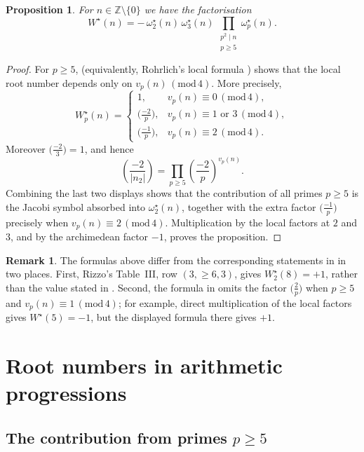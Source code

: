 \documentclass[12pt,reqno]{amsart}
\numberwithin{equation}{section}
\newtheorem{proposition}[theorem]{Proposition}
\theoremstyle{definition}
\newtheorem{remark}[theorem]{Remark}
\renewcommand{\ge}{\geqslant}
\newcommand{\ZZ}{\mathbb{Z}}
\newcommand{\rw}{W}
\renewcommand{\pmod}[1]{\,(\mathrm{mod}\,#1)}
\begin{document}
\begin{proposition}\label{prop:rootnumber-factor-1728}
For $n\in\ZZ\setminus\{0\}$ we have the factorisation
\begin{equation*}
\rw^\star(n)
=
-\,\omega_2^\star(n)\,\omega_3^\star(n)\,
\prod_{\substack{p^2\mid n\\ p\ge 5}} \omega_p^\star(n).
\end{equation*}
\end{proposition}

\begin{proof}
For $p\ge5$, \cite[Table~I]{Riz03} (equivalently, Rohrlich's local formula \cite{Roh93}) shows that the local root number depends only on $v_p(n)\pmod4$.
More precisely,
\[
\rw_p^\star(n)=
\begin{cases}
1,&v_p(n)\equiv0\pmod4,\\
\bigl(\frac{-2}{p}\bigr),&v_p(n)\equiv1\text{ or }3\pmod4,\\
\bigl(\frac{-1}{p}\bigr),&v_p(n)\equiv2\pmod4.
\end{cases}
\]
Moreover $\bigl(\frac{-2}{3}\bigr)=1$, and hence
\[
\left(\frac{-2}{|n_2|}\right)
=\prod_{p\ge5}\left(\frac{-2}{p}\right)^{v_p(n)}.
\]
Combining the last two displays shows that the contribution of all primes $p\ge5$ is the Jacobi symbol absorbed into $\omega_2^\star(n)$, together with the extra factor $\bigl(\frac{-1}{p}\bigr)$ precisely when $v_p(n)\equiv2\pmod4$.
Multiplication by the local factors at $2$ and $3$, and by the archimedean factor $-1$, proves the proposition.
\end{proof}

\begin{remark}\label{rem:VA-corrections}
The formulas above differ from the corresponding statements in \cite{VA} in two places.
First, Rizzo's Table~III, row $(3,\ge6,3)$, gives $\rw_2^\star(8)=+1$, rather than the value stated in \cite[Lemma~4.7]{VA}.
Second, the formula in \cite[Proposition~4.8]{VA} omits the factor $\bigl(\frac{2}{p}\bigr)$ when $p\ge5$ and $v_p(n)\equiv1\pmod4$; for example, direct multiplication of the local factors gives $\rw^\star(5)=-1$, but the displayed formula there gives $+1$.
\end{remark}

\section{Root numbers in arithmetic progressions}\label{sec:average}

\subsection{The contribution from primes $p \ge 5$}
\end{document}
